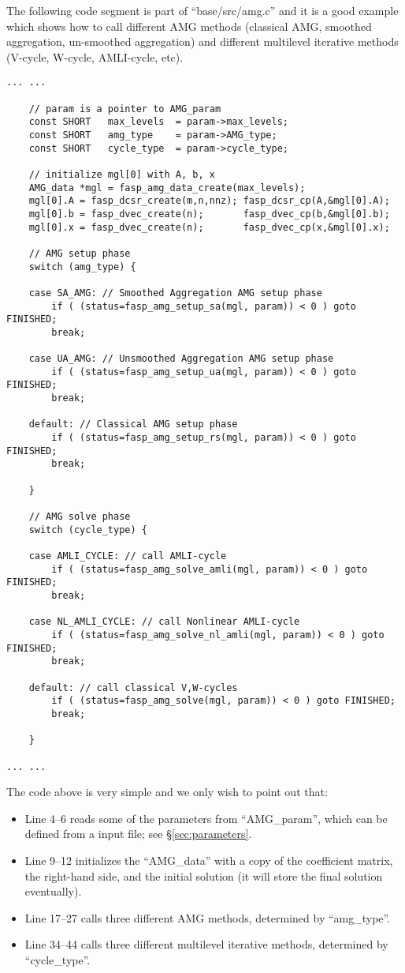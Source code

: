 \documentclass[11pt]{memoir}
\begin{document}
The following code segment is part of ``base/src/amg.c'' and it is a good example which shows how to call different AMG methods (classical AMG, smoothed aggregation, un-smoothed aggregation) and different multilevel iterative methods (V-cycle, W-cycle, AMLI-cycle, etc). 
%
\begin{lstlisting}
... ...

    // param is a pointer to AMG_param
    const SHORT   max_levels  = param->max_levels;
    const SHORT   amg_type    = param->AMG_type;
    const SHORT   cycle_type  = param->cycle_type;    

    // initialize mgl[0] with A, b, x    
    AMG_data *mgl = fasp_amg_data_create(max_levels);
    mgl[0].A = fasp_dcsr_create(m,n,nnz); fasp_dcsr_cp(A,&mgl[0].A);
    mgl[0].b = fasp_dvec_create(n);       fasp_dvec_cp(b,&mgl[0].b);     
    mgl[0].x = fasp_dvec_create(n);       fasp_dvec_cp(x,&mgl[0].x); 
    
    // AMG setup phase
    switch (amg_type) {

    case SA_AMG: // Smoothed Aggregation AMG setup phase
        if ( (status=fasp_amg_setup_sa(mgl, param)) < 0 ) goto FINISHED;
        break;

    case UA_AMG: // Unsmoothed Aggregation AMG setup phase
        if ( (status=fasp_amg_setup_ua(mgl, param)) < 0 ) goto FINISHED;
        break;

    default: // Classical AMG setup phase
        if ( (status=fasp_amg_setup_rs(mgl, param)) < 0 ) goto FINISHED;
        break;

    }
    
    // AMG solve phase
    switch (cycle_type) {

    case AMLI_CYCLE: // call AMLI-cycle
        if ( (status=fasp_amg_solve_amli(mgl, param)) < 0 ) goto FINISHED;
        break;

    case NL_AMLI_CYCLE: // call Nonlinear AMLI-cycle
        if ( (status=fasp_amg_solve_nl_amli(mgl, param)) < 0 ) goto FINISHED;
        break;

    default: // call classical V,W-cycles
        if ( (status=fasp_amg_solve(mgl, param)) < 0 ) goto FINISHED;
        break;

    }
    
... ...
\end{lstlisting}
%
The code above is very simple and we only wish to point out that:
%
\begin{itemize}
\item Line 4--6 reads some of the parameters from ``AMG\_param'', which can be defined from a input file; see \S\ref{sec:parameters}.
\item Line 9--12 initializes the ``AMG\_data'' with a copy of the coefficient matrix, the right-hand side, and the initial solution (it will store the final solution eventually).
\item Line 17--27 calls three different AMG methods, determined by ``amg\_type''.
\item Line 34--44 calls three different multilevel iterative methods, determined by ``cycle\_type''.
\end{itemize}
\end{document}
